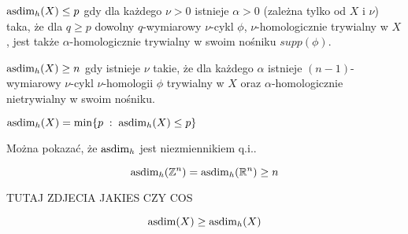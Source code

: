 \begin{definition}{}{}
  $\operatorname{asdim}_h(X)\leq p$ gdy dla każdego $\nu>0$ istnieje $\alpha>0$ (zależna tylko od $X$ i $\nu$) taka, że dla $q\geq p$ dowolny $q$-wymiarowy $\nu$-cykl $\phi$, $\nu$-homologicznie trywialny w $X$, jest także $\alpha$-homologicznie trywialny w swoim nośniku $supp(\phi)$.

  $\operatorname{asdim}_h(X)\geq n$ gdy istnieje $\nu$ takie, że dla każdego $\alpha$ istnieje $(n-1)$-wymiarowy $\nu$-cykl $\nu$-homologii $\phi$ trywialny w $X$ oraz $\alpha$-homologicznie nietrywialny w swoim nośniku.

  $\operatorname{asdim}_h(X)=\min \{p\;:\;\operatorname{asdim}_h(X)\leq p\}$
\end{definition}

Można pokazać, że $\operatorname{asdim}_h$ jest niezmiennikiem q.i..



\begin{theorem}{}{}
  $$\operatorname{asdim}_h(\mathbb{Z}^n)=\operatorname{asdim}_h(\mathbb{R}^n)\geq n$$
\end{theorem}

{\large\color{red}TUTAJ ZDJECIA JAKIES CZY COS}

\begin{theorem}{}{}
  $$\operatorname{asdim}(X)\geq\operatorname{asdim}_h(X)$$
\end{theorem}





